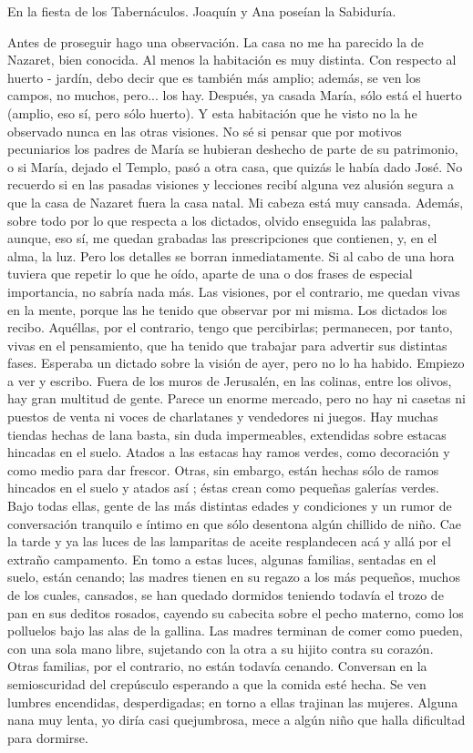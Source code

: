 \documentclass[12pt]{book} %
\begin{document}
En la fiesta de los Tabernáculos.
Joaquín y Ana poseían la Sabiduría. 
 
Antes de proseguir hago una observación.             
La casa no me ha parecido la de Nazaret, bien conocida. Al menos la habitación es muy distinta. Con respecto al huerto 
- jardín, debo decir que es también más amplio; además, se ven los campos, no muchos, pero... los hay. Después, ya casada María, sólo está el huerto (amplio, eso sí, pero sólo huerto). Y esta habitación que he visto no la he observado nunca en las otras visiones. No sé si pensar que por motivos pecuniarios los padres de María se hubieran deshecho de parte de su patrimonio, o si María, dejado el Templo, pasó a otra casa, que quizás le había dado José. No recuerdo si en las pasadas visiones y lecciones recibí alguna vez alusión segura a que la casa de Nazaret fuera la casa natal. 
Mi cabeza está muy cansada. Además, sobre todo por lo que respecta a los dictados, olvido enseguida las palabras, aunque, eso sí, me quedan grabadas las prescripciones que contienen, y, en el alma, la luz. Pero los detalles se borran inmediatamente. Si al cabo de una hora tuviera que repetir lo que he oído, aparte de una o dos frases de especial importancia, no sabría nada más. Las visiones, por el contrario, me quedan vivas en la mente, porque las he tenido que observar por mi misma. Los dictados los recibo. Aquéllas, por el contrario, tengo que percibirlas; permanecen, por tanto, vivas en el pensamiento, que ha tenido que trabajar para advertir sus distintas fases. 
Esperaba un dictado sobre la visión de ayer, pero no lo ha habido. 
Empiezo a ver y escribo.                    
Fuera de los muros de Jerusalén, en las colinas, entre los olivos, hay gran multitud de gente. Parece un enorme 
mercado, pero no hay ni casetas ni puestos de venta ni voces de charlatanes y vendedores ni juegos. Hay muchas tiendas hechas de lana basta, sin duda impermeables, extendidas sobre estacas hincadas en el suelo. Atados a las estacas hay ramos verdes, como decoración y como medio para dar frescor. Otras, sin embargo, están hechas sólo de ramos hincados en el suelo y atados así     ; éstas crean como pequeñas galerías verdes. Bajo todas ellas, gente de las más distintas edades y condiciones y un rumor de conversación tranquilo e íntimo en que sólo desentona algún chillido de niño. 
Cae la tarde y ya las luces de las lamparitas de aceite resplandecen acá y allá por el extraño campamento. En tomo a 
estas luces, algunas familias, sentadas en el suelo, están cenando; las madres tienen en su regazo a los más pequeños, muchos de los cuales, cansados, se han quedado dormidos teniendo todavía el trozo de pan en sus deditos rosados, cayendo su cabecita sobre el pecho materno, como los polluelos bajo las alas de la gallina. Las madres terminan de comer como pueden, con una sola mano libre, sujetando con la otra a su hijito contra su corazón. Otras familias, por el contrario, no están todavía cenando. Conversan en la semioscuridad del crepúsculo esperando a que la comida esté hecha. Se ven lumbres encendidas, desperdigadas; en torno a ellas trajinan las mujeres. Alguna nana muy lenta, yo diría casi quejumbrosa, mece a algún niño que halla dificultad para dormirse. 
\end{document}
